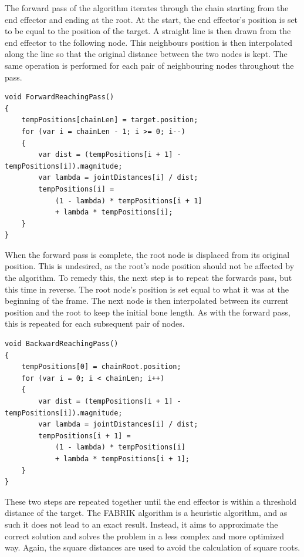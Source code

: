 The forward pass of the algorithm iterates through the chain starting from the
end effector and ending at the root. At the start, the end effector's position
is set to be equal to the position of the target. A straight line is then drawn
from the end effector to the following node. This neighbours position is then
interpolated along the line so that the original distance between the two nodes
is kept. The same operation is performed for each pair of neighbouring nodes
throughout the pass. 

\begin{lstlisting}[basicstyle=\footnotesize, numbers=none,frame=single,
caption={Forward pass},captionpos=b, label=forwards, language={[Sharp]c}]
void ForwardReachingPass()
{
    tempPositions[chainLen] = target.position;
    for (var i = chainLen - 1; i >= 0; i--)
    {
        var dist = (tempPositions[i + 1] - tempPositions[i]).magnitude;
        var lambda = jointDistances[i] / dist;
        tempPositions[i] =
            (1 - lambda) * tempPositions[i + 1]
            + lambda * tempPositions[i];
    }
}
\end{lstlisting}

When the forward pass is complete, the root node is displaced from its original
position. This is undesired, as the root's node position should not be affected
by the algorithm. To remedy this, the next step is to repeat the forwards pass,
but this time in reverse. The root node's position is set equal to what it was
at the beginning of the frame. The next node is then interpolated between its
current position and the root to keep the initial bone length. As with the
forward pass, this is repeated for each subsequent pair of nodes. 

\begin{lstlisting}[basicstyle=\footnotesize, numbers=none,frame=single,
caption={Backward pass},captionpos=b, label=backwards, language={[Sharp]c}]
void BackwardReachingPass()
{
    tempPositions[0] = chainRoot.position;
    for (var i = 0; i < chainLen; i++)
    {
        var dist = (tempPositions[i + 1] - tempPositions[i]).magnitude;
        var lambda = jointDistances[i] / dist;
        tempPositions[i + 1] =
            (1 - lambda) * tempPositions[i]
            + lambda * tempPositions[i + 1];
    }
}
\end{lstlisting}

These two steps are repeated together until the end effector is within
a threshold distance of the target. The FABRIK algorithm is a heuristic
algorithm, and as such it does not lead to an exact result. Instead, it aims to
approximate the correct solution and solves the problem in a less complex and
more optimized way. Again, the square distances are used to avoid the
calculation of square roots. 

